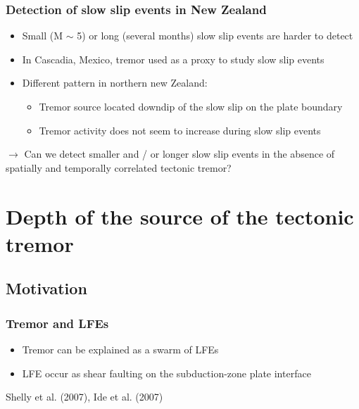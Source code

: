 \documentclass{beamer}
\begin{document}
	\begin{frame}
		\frametitle{Detection of slow slip events in New Zealand}
		\begin{itemize}
			\item Small (M $\sim$ 5) or long (several months) slow slip events are harder to detect
			\item In Cascadia, Mexico, tremor used as a proxy to study slow slip events
			\item Different pattern in northern new Zealand:
			\begin{itemize}
				\item Tremor source located downdip of the slow slip on the plate boundary
				\item Tremor activity does not seem to increase during slow slip events
			\end{itemize}
		\end{itemize}

		\begin{block}{}
			$\rightarrow$ Can we detect smaller and / or longer slow slip events in the absence of spatially and temporally correlated tectonic tremor?
		\end{block}			
	\end{frame}

				
	\section{Depth of the source of the tectonic tremor}

	\subsection{Motivation}

	\begin{frame}
		\frametitle{Tremor and LFEs}
		\begin{itemize}
			\item Tremor can be explained as a swarm of LFEs
			\item LFE occur as shear faulting on the subduction-zone plate interface
		\end{itemize}

		Shelly et al. (2007), Ide et al. (2007)
	\end{frame}
\end{document}
